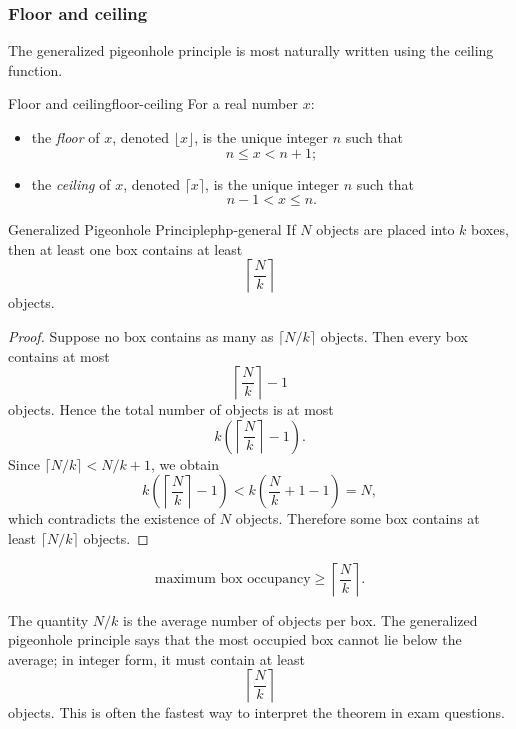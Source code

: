 \subsubsection{Floor and ceiling}

The generalized pigeonhole principle is most naturally written using the ceiling function.

\begin{definition}{Floor and ceiling}{floor-ceiling}
For a real number $x$:
\begin{itemize}[leftmargin=*]
    \item the \emph{floor} of $x$, denoted $\lfloor x\rfloor$, is the unique integer $n$ such that
    \[
    n\le x<n+1;
    \]
    \item the \emph{ceiling} of $x$, denoted $\lceil x\rceil$, is the unique integer $n$ such that
    \[
    n-1<x\le n.
    \]
\end{itemize}
\end{definition}

\begin{theorem}{Generalized Pigeonhole Principle}{php-general}
If $N$ objects are placed into $k$ boxes, then at least one box contains at least
\[
\left\lceil \frac{N}{k}\right\rceil
\]
objects.
\end{theorem}

\begin{proof}
Suppose no box contains as many as $\lceil N/k\rceil$ objects. Then every box contains at most
\[
\left\lceil \frac{N}{k}\right\rceil-1
\]
objects. Hence the total number of objects is at most
\[
k\left(\left\lceil \frac{N}{k}\right\rceil-1\right).
\]
Since $\lceil N/k\rceil < N/k+1$, we obtain
\[
k\left(\left\lceil \frac{N}{k}\right\rceil-1\right)<k\left(\frac{N}{k}+1-1\right)=N,
\]
which contradicts the existence of $N$ objects. Therefore some box contains at least $\lceil N/k\rceil$ objects.
\end{proof}

\begin{keyformula}[title={Generalized form}]
\[
\text{maximum box occupancy}\ge \left\lceil\frac{N}{k}\right\rceil.
\]
\end{keyformula}

\begin{extension}[title={Average-value viewpoint}]
The quantity $N/k$ is the average number of objects per box. The generalized pigeonhole principle says that the most occupied box cannot lie below the average; in integer form, it must contain at least
\[
\left\lceil \frac{N}{k}\right\rceil
\]
objects. This is often the fastest way to interpret the theorem in exam questions.
\end{extension}

